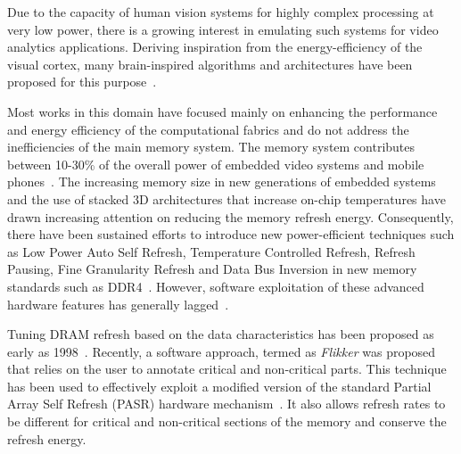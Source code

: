 
Due to the capacity of human vision systems for highly complex processing at very low power, there is a growing interest in emulating such systems for video analytics applications.
Deriving inspiration from the energy-efficiency of the visual cortex, many brain-inspired algorithms and architectures have been proposed for this purpose~\cite{Nere2011,Chen2014,Kestur2012}. %



Most works in this domain have focused mainly on enhancing the performance and energy efficiency of the computational fabrics and do not address the inefficiencies of the main memory system. The memory system contributes between 10-30\% of the overall power of embedded video systems and mobile phones~\cite{CarrollAaronHeiser2010}. 
The increasing memory size in new generations of embedded systems and the use of stacked 3D architectures that increase on-chip temperatures have drawn increasing attention on reducing the memory refresh energy. Consequently, there have been sustained efforts to introduce new power-efficient techniques such as Low Power Auto Self Refresh, Temperature Controlled Refresh, Refresh Pausing, Fine Granularity Refresh and Data Bus Inversion in new memory standards such as DDR4~\cite{jedec-sdram-standards}.  However, software exploitation of these advanced hardware features has generally lagged~\cite{Mukundan2013,refresh-pausing-taco2014}. 

Tuning DRAM refresh based on the data characteristics has been proposed as early as 1998~\cite{islped98}. Recently, a software approach, termed as \emph{Flikker} was proposed that relies on the user to annotate critical and non-critical parts. This technique has been used to effectively exploit a modified version of the standard Partial Array Self Refresh (PASR) hardware mechanism~\cite{Liu2011}. It also allows refresh rates to be different for critical and non-critical sections of the memory and conserve the refresh energy. 

